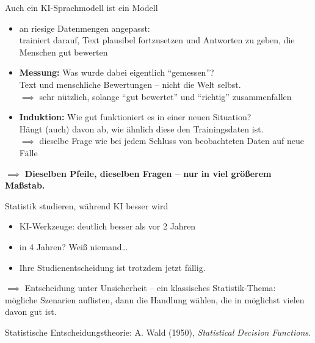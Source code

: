 \documentclass[
  10pt,
  ignorenonframetext,
]{beamer}
\providecommand{\tightlist}{%
  \setlength{\itemsep}{0pt}\setlength{\parskip}{0pt}}
\begin{document}
\begin{frame}{Auch ein KI-Sprachmodell ist ein Modell}
\protect\hypertarget{auch-ein-ki-sprachmodell-ist-ein-modell}{}
\begin{itemize}
\tightlist
\item
  an riesige Datenmengen angepasst:\\
  trainiert darauf, Text plausibel fortzusetzen und Antworten zu geben,
  die Menschen gut bewerten
\item
  \textbf{Messung:} Was wurde dabei eigentlich ``gemessen''?\\
  Text und menschliche Bewertungen -- nicht die Welt selbst.\\
  \(\implies\) sehr nützlich, solange ``gut bewertet'' und ``richtig''
  zusammenfallen
\item
  \textbf{Induktion:} Wie gut funktioniert es in einer neuen
  Situation?\\
  Hängt (auch) davon ab, wie ähnlich diese den Trainingsdaten ist.\\
  \(\implies\) dieselbe Frage wie bei jedem Schluss von beobachteten
  Daten auf neue Fälle
\end{itemize}

\(\implies\) \textbf{Dieselben Pfeile, dieselben Fragen -- nur in viel
größerem Maßstab.}
\end{frame}

\begin{frame}{Statistik studieren, während KI besser wird}
\protect\hypertarget{statistik-studieren-wuxe4hrend-ki-besser-wird}{}
\begin{itemize}
\tightlist
\item
  KI-Werkzeuge: deutlich besser als vor 2 Jahren
\item
  in 4 Jahren? Weiß niemand\ldots{}
\item
  Ihre Studienentscheidung ist trotzdem jetzt fällig.
\end{itemize}

\(\implies\) Entscheidung unter Unsicherheit -- ein klassisches
Statistik-Thema:\\
mögliche Szenarien auflisten, dann die Handlung wählen, die in möglichst
vielen davon gut ist.

\vspace{0pt plus 1filll}

\footnotesize Statistische Entscheidungstheorie: A. Wald (1950),
\emph{Statistical Decision Functions}.
\end{frame}
\end{document}

